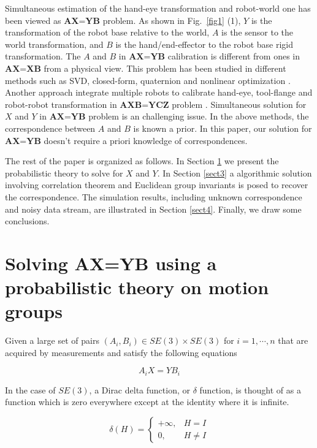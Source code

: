 \documentclass[letterpaper, 10 pt, conference]{ieeeconf}  %
\begin{document}
Simultaneous estimation of the hand-eye transformation and robot-world one
has been viewed as $\textbf{AX=YB}$ problem. As shown in Fig.~\ref{fig1} (1), $Y$ is the transformation of the robot base relative to the world, $A$ is the sensor to the world transformation, and $B$ is the hand/end-effector to the robot base rigid transformation. The $A$ and $B$ in $\textbf{AX=YB}$ calibration is different from ones in $\textbf{AX=XB}$ from a physical view. This problem has been studied in different methods such as SVD, closed-form, quaternion and nonlinear optimization \cite{Zhuang1994,dornaika1998simultaneous,Hirsh2001, ernst2012non,strobl2006optimal,Li2010,Shah2013,Heller2014}. Another approach integrate multiple robots to calibrate hand-eye, tool-flange and robot-robot transformation in $\textbf{AXB=YCZ}$ problem \cite{Wang2014}. Simultaneous solution for $X$ and $Y$ in $\textbf{AX=YB}$ problem is an challenging issue. In the above methods, the correspondence between $A$ and $B$ is known a prior. In this paper, our solution for $\textbf{AX=YB}$ doesn't require a priori knowledge of correspondences.

The rest of the paper is organized as follows. In Section
\ref{sect2} we present the probabilistic theory to solve for $X$ and $Y$. In Section \ref{sect3} a algorithmic solution involving correlation theorem and Euclidean group invariants is posed to recover the correspondence. The simulation results, including unknown correspondence and noisy data stream, are illustrated in Section \ref{sect4}. Finally, we draw some conclusions.

\section{Solving AX=YB using a probabilistic theory on motion groups}
\label{sect2}

Given a large set of pairs $(A_{i},B_{i})\in SE(3)\times SE(3)$ for $i=1,\cdots,n$ that are acquired by measurements and satisfy the following equations

\begin{equation}\label{equ1}
A_{i}X=YB_{i}
\end{equation}

In the case of $SE(3)$, a Dirac delta function, or $\delta$ function, is thought of as a function which is zero everywhere except at the identity where it is infinite.

\begin{equation}\label{equ2}
\delta{(H)}=
\left\{
\begin{array}{ll}
+\infty, & H=I \\
0, & H \neq I
\end{array}
\right.
\end{equation}
\end{document}
